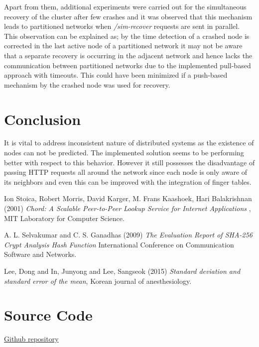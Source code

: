 \documentclass[
    a4paper,
    twocolumn,
]{article}
\begin{document}
Apart from them, additional experiments were carried out for the simultaneous recovery of the cluster after few crashes and it was observed that this mechanism leads to partitioned networks when \textit{/sim-recover} requests are sent in parallel. This observation can be explained as; by the time detection of a crashed node is corrected in the last active node of a partitioned network it may not be aware that a separate recovery is occurring in the adjacent network and hence lacks the communication between partitioned networks due to the implemented pull-based approach with timeouts. This could have been minimized if a push-based mechanism by the crashed node was used for recovery.

\section{Conclusion}

It is vital to address inconsistent nature of distributed systems as the existence of nodes can not be predicted. The implemented solution seems to be performing better with respect to this behavior. However it still possesses the disadvantage of passing HTTP requests all around the network since each node is only aware of its neighbors and even this can be improved with the integration of finger tables. 

\begin{thebibliography}{9}	
	Ion Stoica, Robert Morris, David Karger, M. Frans Kaashoek, Hari Balakrishnan (2001) \emph{Chord: A Scalable Peer-to-Peer Lookup Service for Internet Applications }, MIT Laboratory for Computer Science.
	
	A. L. Selvakumar and C. S. Ganadhas (2009) \emph{The Evaluation Report of SHA-256 Crypt Analysis Hash Function} International Conference on Communication Software and Networks.
	
	Lee, Dong and In, Junyong and Lee, Sangseok (2015) \emph{Standard deviation and standard error of the mean}, Korean journal of anesthesiology.
\end{thebibliography}

\appendix
\section{Source Code}
\href{https://github.com/YasiruR/dht}{Github repository}
\end{document}
